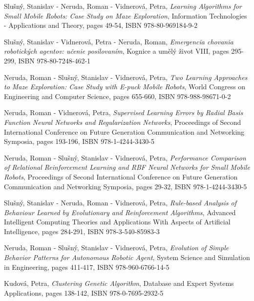 \vspace{0.4em}
\noindent
Slušný, Stanislav - Neruda, Roman - Vidnerová, Petra, {\em Learning Algorithms for Small Mobile Robots: Case Study on Maze Exploration}, Information Technologies - Applications and Theory, pages 49-54, ISBN 978-80-969184-9-2

\vspace{0.4em}
\noindent
Slušný, Stanislav - Vidnerová, Petra - Neruda, Roman, {\em Emergencia chovania robotických agentov: učenie posilovaním}, Kognice a umělý život VIII, pages 295-299, ISBN 978-80-7248-462-1

\vspace{0.4em}
\noindent
Neruda, Roman - Slušný, Stanislav - Vidnerová, Petra, {\em Two Learning Approaches to Maze Exploration: Case Study with E-puck Mobile Robots}, World Congress on Engineering and Computer Science, pages 655-660, ISBN 978-988-98671-0-2

\vspace{0.4em}
\noindent
Neruda, Roman - Vidnerová, Petra, {\em Supervised Learning Errors by Radial Basis Function Neural Networks and Regularization Networks}, Proceedings of Second International Conference on Future Generation Communication and Networking Symposia, pages 193-196, ISBN 978-1-4244-3430-5

\vspace{0.4em}
\noindent
Neruda, Roman - Slušný, Stanislav - Vidnerová, Petra, {\em Performance Comparison of Relational Reinforcement Learning and RBF Neural Networks for Small Mobile Robots}, Proceedings of Second International Conference on Future Generation Communication and Networking Symposia, pages 29-32, ISBN 978-1-4244-3430-5

\vspace{0.4em}
\noindent
Slušný, Stanislav - Neruda, Roman - Vidnerová, Petra, {\em Rule-based Analysis of Behaviour Learned by Evolutionary and Reinforcement Algorithms}, Advanced Intelligent Computing Theories and Applications With Aspects of Artificial Intelligence, pages 284-291, ISBN 978-3-540-85983-3

\vspace{0.4em}
\noindent
Neruda, Roman - Slušný, Stanislav - Vidnerová, Petra, {\em Evolution of Simple Behavior Patterns for Autonomous Robotic Agent}, System Science and Simulation in Engineering, pages 411-417, ISBN 978-960-6766-14-5

\vspace{0.4em}
\noindent
Kudová, Petra, {\em Clustering Genetic Algorithm}, Database and Expert Systems Applications, pages 138-142, ISBN 978-0-7695-2932-5

